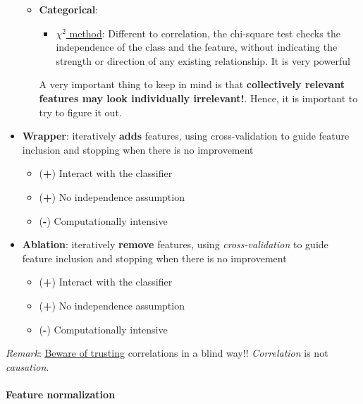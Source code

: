 \begin{itemize}
\begin{itemize}
\item \textbf{Categorical}: 
\begin{itemize}
\item \href{https://en.wikipedia.org/wiki/Chi-squared_test}{$\chi^2$ method}: Different to correlation, the chi-square test checks the independence of the class and the feature, without indicating the strength or direction of any existing relationship. It is very powerful
\end{itemize}

A very important thing to keep in mind is that \textbf{collectively relevant features may look individually irrelevant!}. Hence, it is important to try to figure it out.
\end{itemize}

\item \textbf{Wrapper}: iteratively \textbf{adds} features, using cross-validation to guide feature inclusion and stopping when there is no improvement

\begin{itemize}
\item (\textbf{+}) Interact with the classifier
\item (\textbf{+}) No independence assumption
\item (\textbf{-}) Computationally intensive
\end{itemize}

\item \textbf{Ablation}: iteratively \textbf{remove} features, using \emph{cross-validation} to guide feature inclusion and stopping when there is no improvement

\begin{itemize}
\item (\textbf{+}) Interact with the classifier
\item (\textbf{+}) No independence assumption
\item (\textbf{-}) Computationally intensive
\end{itemize}

\end{itemize}

\emph{Remark}: \href{http://www.tylervigen.com/spurious-correlations}{Beware of trusting} correlations in a blind way!! \emph{Correlation} is not \emph{causation}.

\paragraph{Feature normalization}

